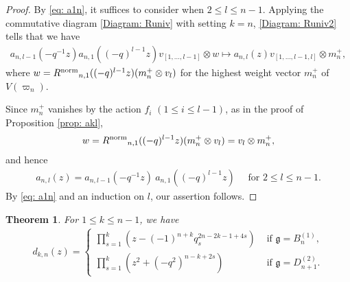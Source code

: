 \documentclass[11pt, leqno]{amsart}
\newtheorem{theorem}{Theorem}[section]
\theoremstyle{definition}
\numberwithin{equation}{section}
\begin{document}
\begin{proof}
By \eqref{eq: a1n}, it suffices to consider when $2 \le l \le n-1$.
Applying the commutative diagram \eqref{Diagram: Runiv} with setting $k=n$, \eqref{Diagram: Runiv2} tells that we have
\begin{align*}
a_{n,l-1}(-q^{-1}z) a_{n,1}((-q)^{l-1}z)v_{[1,\ldots, l-1]} \otimes w \longmapsto a_{n,l}(z) v_{[1,\ldots, l-1,l]} \otimes m^+_{n},
\end{align*}
where $w={R^{\rm{norm}}}_{n,1}((-q)^{l-1}z)(m^+_{n} \otimes v_{l})$ for the highest weight vector $m_n^+$ of $V({\varpi}_n)$.

Since $m^+_{n}$ vanishes by the action $f_i$ $( 1 \le i \le l-1)$, as in the proof of Proposition \ref{prop: akl},
\begin{align*}
w= {R^{\rm{norm}}}_{n,1}((-q)^{l-1}z)(m^+_{n} \otimes v_{l})= v_{l} \otimes m^+_{n},
\end{align*}
and hence
\begin{align} \label{eq:recursive formula a_nk}
a_{n,l}(z) = a_{n,l-1}(-q^{-1}z) \ a_{n,1}((-q)^{l-1}z) \quad \text{ for $2 \le l \le n-1$}.
\end{align}
By \eqref{eq: a1n} and an induction on $l$, our assertion follows.
\end{proof}

\begin{theorem}
  For $1 \le k \le n-1$, we have
  \begin{align}\label{eq:dkn}
    d_{k,n}(z)= \begin{cases} \displaystyle \prod_{s=1}^{k}(z-(-1)^{n+k}q_s^{2n-2k-1+4s}) & \text{ if } {\mathfrak g} =B^{(1)}_n, \\
                              \displaystyle \prod_{s=1}^{k}(z^2+(-q^{2})^{n-k+2s}) & \text{ if } {\mathfrak g} =D^{(2)}_{n+1}. \end{cases}
  \end{align}
\end{theorem}
\end{document}
